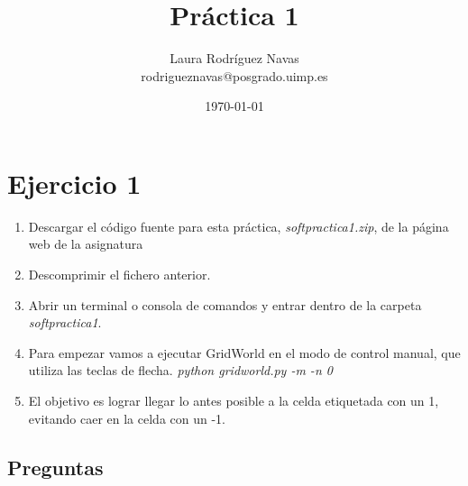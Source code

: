 \documentclass[11pt]{exam}
\title{Práctica 1}
\author{Laura Rodríguez Navas \\ rodrigueznavas@posgrado.uimp.es}
\date{{\selectlanguage{spanish}\today} }
\begin{document}
	
\maketitle

\section*{Ejercicio 1}

\begin{enumerate}
	\item Descargar el código fuente para esta práctica, \textit{softpractica1.zip}, de la página web de la asignatura
	\item Descomprimir el fichero anterior.
	\item Abrir un terminal o consola de comandos y entrar dentro de la carpeta \textit{softpractica1}.
	\item Para empezar vamos a ejecutar GridWorld en el modo de control manual, que utiliza las teclas de flecha. \textit{python gridworld.py -m -n 0}
	\item El objetivo es lograr llegar lo antes posible a la celda etiquetada con un 1, evitando caer en la celda con un -1.
\end{enumerate}

\subsection*{Preguntas}
\end{document}
